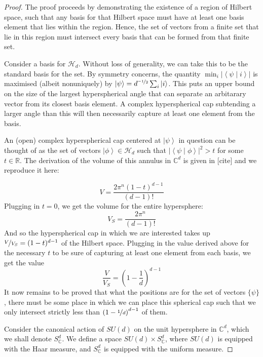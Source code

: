 \documentclass{amsart}
\theoremstyle{definition}
\newcommand{\ket}[1]{{\left\vert{#1}\right\rangle}}
\newcommand{\braket}[2]{{\left< {#1} \middle\vert {#2}\right>}}
\newcommand{\sprod}[2]{\left|\left< {#1} \middle| {#2} \right>\right|}
\begin{document}
\begin{proof}
The proof proceeds by demonstrating the existence of a region of Hilbert space, such that any basis for that Hilbert space must have at least one basis element that lies within the region. Hence, the set of vectors from a finite set that lie in this region must intersect every basis that can be formed from that finite set.

Consider a basis for $\mathcal{H}_d$. Without loss of generality, we can take this to be the standard basis for the set. By symmetry concerns, the quantity $\min_i \left|\braket{\psi}{i}\right|$ is maximised (albeit nonuniquely) by $\ket{\psi}=d^{\nicefrac{-1}{2}}\sum_i\ket{i}$. This puts an upper bound on the size of the largest hyperspherical angle that can separate an arbitarary vector from its closest basis element. A complex hyperspherical cap subtending a larger angle than this will then necessarily capture at least one element from the basis.

An (open) complex hyperspherical cap centered at $\ket{\psi}$ in question can be thought of as the set of vectors $\ket{\phi}\in\mathcal{H}_d$ such that $\sprod{\psi}{\phi}^2> t$ for some $t\in\mathbb{R}$. The derivation of the volume of this annulus in $\mathbb{C}^d$ is given in [cite] and we reproduce it here:

\begin{equation}V=\frac{2\pi^n(1-t)^{d-1}}{(d-1)!}\end{equation}
Plugging in $t=0$, we get the volume for the entire hypersphere:
\begin{equation}V_S=\frac{2\pi^n}{(d-1)!}\end{equation}
And so the hyperspherical cap in which we are interested takes up $\nicefrac{V}{V_S}=(1-t)^{d-1}$ of the Hilbert space. Plugging in the value derived above for the necessary $t$ to be sure of capturing at least one element from each basis, we get the value
\begin{equation}
\frac{V}{V_S}=\left(1-\frac1d \right)^{d-1}
\end{equation}
It now remains to be proved that what the positions are for the set of vectors $\{\psi\}$, there must be some place in which we can place this spherical cap such that we only intersect strictly less than $\left(1-\nicefrac1d \right)^{d-1}$ of them. 

Consider the canonical action of $SU(d)$ on the unit hypersphere in $\mathbb{C}^d$, which we shall denote $S_\mathbb{C}^d$. We define a space $SU(d)\times S_\mathbb{C}^d$, where $SU(d)$ is equipped with the Haar measure, and $S_\mathbb{C}^d$ is equipped with the uniform measure.


\end{proof}
\end{document}

